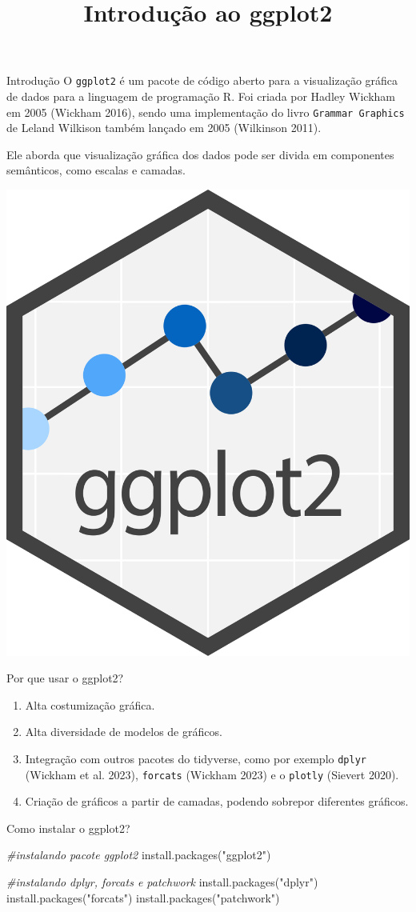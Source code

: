\documentclass[
  ignorenonframetext,
]{beamer}
\title{Introdução ao ggplot2}
\author{}
\date{}
\institute{UNIVERSIDADE FEDERAL DE PELOTAS \and INSTITUTO DE FÍSICA E
MATEMÁTICA -- IFM}
\newenvironment{Shaded}{}{}
\newcommand{\CommentTok}[1]{\textcolor[rgb]{0.38,0.63,0.69}{\textit{#1}}}
\newcommand{\FunctionTok}[1]{\textcolor[rgb]{0.02,0.16,0.49}{#1}}
\newcommand{\NormalTok}[1]{#1}
\newcommand{\StringTok}[1]{\textcolor[rgb]{0.25,0.44,0.63}{#1}}
\begin{document}
\frame{\titlepage}


\begin{frame}[fragile]{Introdução}
\label{introduuxe7uxe3o}
O \texttt{ggplot2} é um pacote de código aberto para a visualização
gráfica de dados para a linguagem de programação R. Foi criada por
Hadley Wickham em 2005 (Wickham 2016), sendo uma implementação do livro
\texttt{Grammar\ Graphics} de Leland Wilkison também lançado em 2005
(Wilkinson 2011).

Ele aborda que visualização gráfica dos dados pode ser divida em
componentes semânticos, como escalas e camadas.

\begin{center}
\includegraphics[width=0.2\linewidth,height=\textheight,keepaspectratio]{Ggplot2_hex_logo.svg.png}
\end{center}
\end{frame}

\begin{frame}[fragile]{Por que usar o ggplot2?}
\label{por-que-usar-o-ggplot2}
\begin{enumerate}
\item
  Alta costumização gráfica.
\item
  Alta diversidade de modelos de gráficos.
\item
  Integração com outros pacotes do tidyverse, como por exemplo
  \texttt{dplyr} (Wickham et al. 2023), \texttt{forcats} (Wickham 2023)
  e o \texttt{plotly} (Sievert 2020).
\item
  Criação de gráficos a partir de camadas, podendo sobrepor diferentes
  gráficos.
\end{enumerate}
\end{frame}

\begin{frame}[fragile]{Como instalar o ggplot2?}
\label{como-instalar-o-ggplot2}
\begin{Shaded}
\begin{Highlighting}[]
\CommentTok{\#instalando pacote ggplot2}
\FunctionTok{install.packages}\NormalTok{(}\StringTok{"ggplot2"}\NormalTok{)}

\CommentTok{\#instalando dplyr, forcats e patchwork}
\FunctionTok{install.packages}\NormalTok{(}\StringTok{"dplyr"}\NormalTok{)}
\FunctionTok{install.packages}\NormalTok{(}\StringTok{"forcats"}\NormalTok{)}
\FunctionTok{install.packages}\NormalTok{(}\StringTok{"patchwork"}\NormalTok{)}
\end{Highlighting}
\end{Shaded}
\end{frame}
\end{document}
